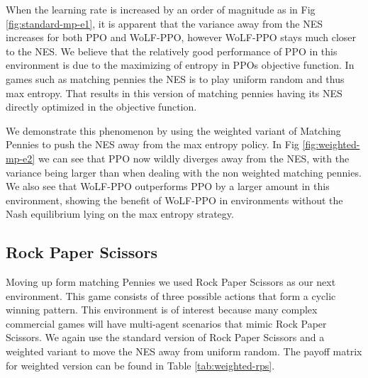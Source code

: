 \documentclass[conference]{IEEEtran}
\begin{document}
When the learning rate is increased by an order of magnitude as in Fig \ref{fig:standard-mp-e1}, it is apparent that the variance away from the NES increases for both PPO and WoLF-PPO, however WoLF-PPO stays much closer to the NES. We believe that the relatively good performance of PPO in this environment is due to the maximizing of entropy in PPOs objective function. In games such as matching pennies the NES is to play uniform random and thus max entropy. That results in this version of matching pennies having its NES directly optimized in the objective function.

We demonstrate this phenomenon by using the weighted variant of Matching Pennies to push the NES away from the max entropy policy. In Fig \ref{fig:weighted-mp-e2} we can see that PPO now wildly diverges away from the NES, with the variance being larger than when dealing with the non weighted matching pennies. We also see that WoLF-PPO outperforms PPO by a larger amount in this environment, showing the benefit of WoLF-PPO in environments without the Nash equilibrium lying on the max entropy strategy.

\subsection{Rock Paper Scissors}

Moving up form matching Pennies we used Rock Paper Scissors as our next environment. This game consists of three possible actions that form a cyclic winning pattern. This environment is of interest because many complex commercial games will have multi-agent scenarios that mimic Rock Paper Scissors\cite{balduzzi2019open}. We again use the standard version of Rock Paper Scissors and a weighted variant to move the NES away from uniform random. The payoff matrix for weighted version can be found in Table \ref{tab:weighted-rps}.

\end{document}
